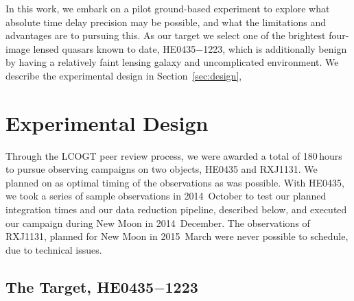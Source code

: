 \documentclass[iop]{emulateapj}
\begin{document}
In this work, we embark on a pilot ground-based experiment to explore
what absolute time delay precision may be possible, and what the
limitations and advantages are to pursuing this. As our target we
select one of the brightest four-image lensed quasars known to date,
HE0435$-$1223, which is additionally benign by having a relatively
faint lensing galaxy and uncomplicated environment.  We describe the
experimental design in Section~\ref{sec:design}, 


\section{Experimental Design\label{sec:design}}

Through the LCOGT peer review process, we were awarded a total of
180\,hours to pursue observing campaigns on two objects, HE0435 and
RXJ1131.  We planned on as optimal timing of the observations as was
possible.  With HE0435, we took a series of sample observations in
2014~October to test our planned integration times and our data
reduction pipeline, described below, and executed our campaign during
New Moon in 2014~December.  The observations of RXJ1131, planned for
New Moon in 2015~March were never possible to schedule, due to
technical issues. 
% 
% 
% 

\subsection{The Target, HE0435$-$1223}
\end{document}
